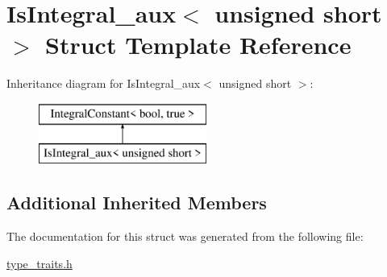 \hypertarget{struct_is_integral__aux_3_01unsigned_01short_01_4}{}\section{Is\+Integral\+\_\+aux$<$ unsigned short $>$ Struct Template Reference}
\label{struct_is_integral__aux_3_01unsigned_01short_01_4}
Inheritance diagram for Is\+Integral\+\_\+aux$<$ unsigned short $>$\+:\begin{figure}[H]
\begin{center}
\leavevmode
\includegraphics[height=2.000000cm]{struct_is_integral__aux_3_01unsigned_01short_01_4}
\end{center}
\end{figure}
\subsection*{Additional Inherited Members}


The documentation for this struct was generated from the following file\+:\begin{DoxyCompactItemize}
\item 
\hyperlink{type__traits_8h}{type\+\_\+traits.\+h}\end{DoxyCompactItemize}

